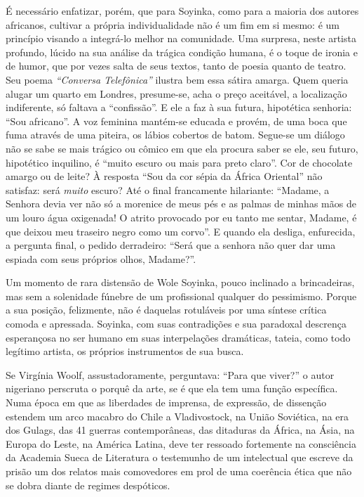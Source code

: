 \documentclass[
  letterpaper,
  DIV=11,
  numbers=noendperiod]{scrreprt}
\begin{document}
É necessário enfatizar, porém, que para Soyinka, como para a maioria dos
autores africanos, cultivar a própria individualidade não é um fim em si
mesmo: é um princípio visando a integrá-lo melhor na comunidade. Uma
surpresa, neste artista profundo, lúcido na sua análise da trágica
condição humana, é o toque de ironia e de humor, que por vezes salta de
seus textos, tanto de poesia quanto de teatro. Seu poema
\emph{``Conversa Telefônica''} ilustra bem essa sátira amarga. Quem
queria alugar um quarto em Londres, presume-se, acha o preço aceitável,
a localização indiferente, só faltava a ``confissão''. E ele a faz à sua
futura, hipotética senhoria: ``Sou africano''. A voz feminina mantém-se
educada e provém, de uma boca que fuma através de uma piteira, os lábios
cobertos de batom. Segue-se um diálogo não se sabe se mais trágico ou
cômico em que ela procura saber se ele, seu futuro, hipotético
inquilino, é ``muito escuro ou mais para preto claro''. Cor de chocolate
amargo ou de leite? À resposta ``Sou da cor sépia da África Oriental''
não satisfaz: será \emph{muito} escuro? Até o final francamente
hilariante: ``Madame, a Senhora devia ver não só a morenice de meus pés
e as palmas de minhas mãos de um louro água oxigenada! O atrito
provocado por eu tanto me sentar, Madame, é que deixou meu traseiro
negro como um corvo''. E quando ela desliga, enfurecida, a pergunta
final, o pedido derradeiro: ``Será que a senhora não quer dar uma
espiada com seus próprios olhos, Madame?''.

Um momento de rara distensão de Wole Soyinka, pouco inclinado a
brincadeiras, mas sem a solenidade fúnebre de um profissional qualquer
do pessimismo. Porque a sua posição, felizmente, não é daquelas
rotuláveis por uma síntese crítica comoda e apressada. Soyinka, com suas
contradições e sua paradoxal descrença esperançosa no ser humano em suas
interpelações dramáticas, tateia, como todo legítimo artista, os
próprios instrumentos de sua busca.

Se Virgínia Woolf, assustadoramente, perguntava: ``Para que viver?'' o
autor nigeriano perscruta o porquê da arte, se é que ela tem uma função
específica. Numa época em que as liberdades de imprensa, de expressão,
de dissenção estendem um arco macabro do Chile a Vladivostock, na União
Soviética, na era dos Gulags, das 41 guerras contemporâneas, das
ditaduras da África, na Ásia, na Europa do Leste, na América Latina,
deve ter ressoado fortemente na consciência da Academia Sueca de
Literatura o testemunho de um intelectual que escreve da prisão um dos
relatos mais comovedores em prol de uma coerência ética que não se dobra
diante de regimes despóticos.
\end{document}
